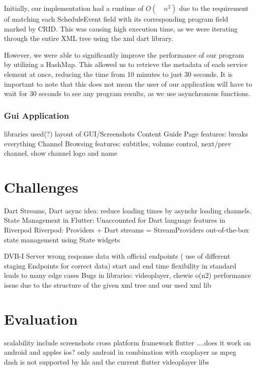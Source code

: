 \documentclass[conference]{IEEEtran}
\begin{document}
Initially, our implementation had a runtime of $O (\quad n^2)$ due to the requirement of matching each ScheduleEvent field with its corresponding program field marked by CRID. This was causing high execution time, as we were iterating through the entire XML tree using the xml dart library.

However, we were able to significantly improve the performance of our program by utilizing a HashMap. This allowed us to retrieve the metadata of each service element at once, reducing the time from 10 minutes to just 30 seconds. It is important to note that this does not mean the user of our application will have to wait for 30 seconds to see any program results, as we use asynchronous functions.







\subsubsection{Gui Application}\label{gui}

libraries used(?)
layout of GUI/Screenshots
Content Guide Page
features: breaks everything 
Channel Browsing
features: subtitles, volume control, next/prev channel, show channel logo and name

\section{Challenges}

Dart Streams, Dart async
idea: reduce loading times by asynchr loading channels. 
State Management in Flutter: 
Unaccounted for Dart language features in Riverpod
Riverpod: Providers + Dart streams = StreamProviders
out-of-the-box state management using State widgets
	
DVB-I Server wrong response data with official endpoints ( use of different staging Endpoints for correct data)
start and end time 
flexibility in standard leads to many edge cases 
Bugs in libraries: videoplayer, chewie
o(n2) performance issue due to the structure of the given xml tree and our used xml lib

\section{Evaluation}

scalability
include screenshots cross platform framework flutter ....does it work on android and apples ios?
only android in combination with exoplayer as mpeg dash is not supported by hls and the current flutter videoplayer libs
\end{document}

